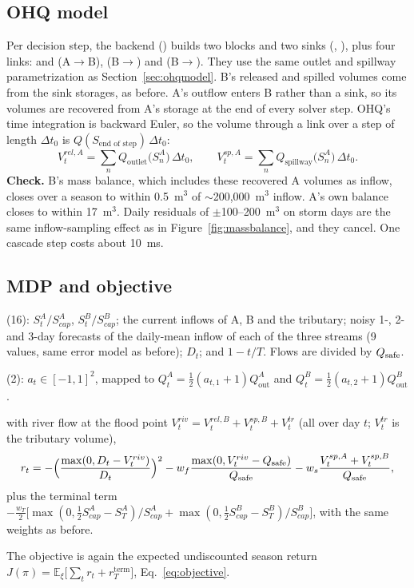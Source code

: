 \subsection{OHQ model}
Per decision step, the backend () builds two
 blocks and two  sinks
(, ), plus four 
links:  and  (A$\to$B), 
(B$\to$) and  (B$\to$). They use
the same outlet and spillway parametrization as Section~\ref{sec:ohqmodel}.
B's released and spilled volumes come from the sink storages, as before.
A's outflow enters B rather than a sink, so its volumes are recovered from
A's storage at the end of every solver step. OHQ's time integration is
backward Euler, so the volume through a link over a step of length
$\Delta t_0$ is $Q(S_{\text{end of step}})\,\Delta t_0$:
\[
V^{rel,A}_t=\sum_{n}Q_{\text{outlet}}\big(S^A_n\big)\,\Delta t_0,\qquad
V^{sp,A}_t=\sum_{n}Q_{\text{spillway}}\big(S^A_n\big)\,\Delta t_0 .
\]
\textbf{Check.} B's mass balance, which includes these recovered A volumes
as inflow, closes over a season to within 0.5~m$^3$ of
$\sim$200{,}000~m$^3$ inflow. A's own balance closes to within 17~m$^3$.
Daily residuals of $\pm$100--200~m$^3$ on storm days are the same
inflow-sampling effect as in Figure~\ref{fig:massbalance}, and they cancel.
One cascade step costs about 10~ms.

\subsection{MDP and objective}
\begin{description}\itemsep2pt
\item[Observation] (16): $S^A_t/S^A_{cap}$, $S^B_t/S^B_{cap}$; the current
inflows of A, B and the tributary; noisy 1-, 2- and 3-day forecasts of the
daily-mean inflow of each of the three streams (9 values, same error
model as before); $D_t$; and $1-t/T$. Flows are divided by $Q_{\mathrm{safe}}$.
\item[Action] (2): $a_t\in[-1,1]^2$, mapped to
$Q^A_t=\tfrac12(a_{t,1}+1)Q^A_{\mathrm{out}}$ and
$Q^B_t=\tfrac12(a_{t,2}+1)Q^B_{\mathrm{out}}$.
\item[Reward:] with river flow at the flood point
$V^{riv}_t=V^{rel,B}_t+V^{sp,B}_t+V^{tr}_t$ (all over day $t$; $V^{tr}_t$
is the tributary volume),
\[
r_t=-\Big(\frac{\max(0,D_t-V^{riv}_t)}{D_t}\Big)^2
-w_f\frac{\max(0,V^{riv}_t-Q_{\mathrm{safe}})}{Q_{\mathrm{safe}}}
-w_s\frac{V^{sp,A}_t+V^{sp,B}_t}{Q_{\mathrm{safe}}},
\]
plus the terminal term
$-\tfrac{w_T}{2}\big[\max(0,\tfrac12S^A_{cap}-S^A_T)/S^A_{cap}+\max(0,\tfrac12S^B_{cap}-S^B_T)/S^B_{cap}\big]$,
with the same weights as before.
\end{description}
The objective is again the expected undiscounted season return
$J(\pi)=\mathbb E_\xi\big[\sum_t r_t+r^{\mathrm{term}}_T\big]$,
Eq.~\eqref{eq:objective}.

